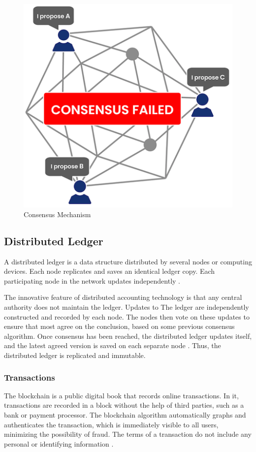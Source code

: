 \begin{figure}[htbp]
\begin{center}
  \includegraphics[scale=0.55]{images/consensus.png}
\caption{Consensus Mechanism}
\label{fig:Consensus}
\end{center}
\end{figure}


\subsection{Distributed Ledger}\label{sec:livro}
A distributed ledger is a data structure distributed by several nodes or computing devices. Each node replicates and saves an identical ledger copy. Each participating node in the network updates independently \cite{greve2018blockchain}.

The innovative feature of distributed accounting technology is that any central authority does not maintain the ledger. Updates to The ledger are independently constructed and recorded by each node. The nodes then vote on these updates to ensure that most agree on the conclusion, based on some previous consensus algorithm. Once consensus has been reached, the distributed ledger updates itself, and the latest agreed version is saved on each separate node \cite{swan2015blockchain}. Thus, the distributed ledger is replicated and immutable. 

\subsubsection{Transactions}\label{sec:transac}
The blockchain is a public digital book that records online transactions. In it, transactions are recorded in a block without the help of third parties, such as a bank or payment processor. The blockchain algorithm automatically graphs and authenticates the transaction, which is immediately visible to all users, minimizing the possibility of fraud. The terms of a transaction do not include any personal or identifying information \cite{Bankrate2018}.

